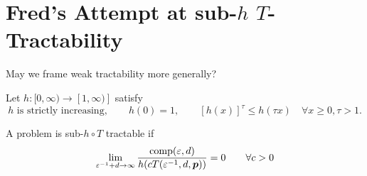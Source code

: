 \documentclass[11pt,a4paper]{article}
\begin{document}
\section{Fred's Attempt at sub-$h$ $T$-Tractability}
May we frame weak tractability more generally?

Let $h:[0,\infty) \to [1,\infty)]$ satisfy
\begin{equation} \label{eq:h_cond}
	h \text{ is strictly increasing}, \qquad 
	h(0)=1, \qquad  [h(x)]^\tau \le h(\tau x) \quad \forall x \ge 0, \tau > 1.
\end{equation}

\begin{definition} \label{def:subhT}
	A problem is sub-$h \circ T$ tractable if
	\begin{equation*}
		\lim_{\varepsilon^{-1} + d \to \infty} \frac{\operatorname{comp}(\varepsilon,d)}{h(cT(\varepsilon^{-1},d,\boldsymbol{p}))} = 0 \qquad \forall c>0
	\end{equation*}
\end{definition}
\end{document}
